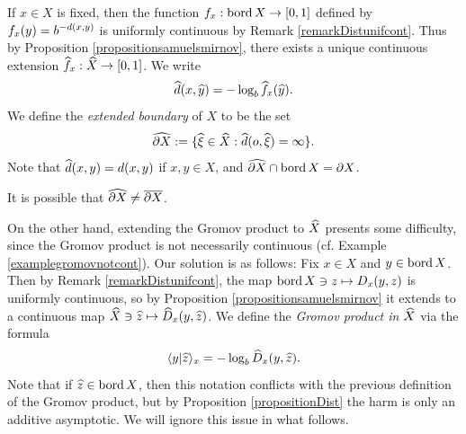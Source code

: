 \begin{observation}
If $x\in X$ is fixed, then the function $f_x:\operatorname{bord} X\to [0,1]$ defined by $f_x(y) = b^{-d(x,y)}$ is uniformly continuous by Remark \ref{remarkDistunifcont}. Thus by Proposition \ref{propositionsamuelsmirnov}, there exists a unique continuous extension $\fhat_x:\what X\to [0,1]$. We write 
\[
\dhat(x,\what y) = -\log_b\fhat_x(\what y).
\]
We define the \emph{extended boundary} of $X$ to be the set
\[
\what{\del X} := \{\xihat\in\what X:\dhat(\zero,\xihat) = \infty\}.
\]
Note that $\dhat(x,y) = \dist(x,y)$ if $x,y\in X$, and $\widehat{\partial X} \cap \operatorname{bord} X = \partial X$.
\end{observation}

\begin{warning*}
It is possible that $\widehat{\partial X}\neq\overline{\partial X}$.
\end{warning*}

On the other hand, extending the Gromov product to $\widehat X$ presents some difficulty, since the Gromov product is not necessarily continuous (cf. Example \ref{examplegromovnotcont}). Our solution is as follows: Fix $x\in X$ and $y\in\operatorname{bord} X$. Then by Remark \ref{remarkDistunifcont}, the map $\operatorname{bord} X\ni z\mapsto D_x(y,z)$ is uniformly continuous, so by Proposition \ref{propositionsamuelsmirnov} it extends to a continuous map $\widehat X\ni \widehat z\mapsto \widehat{D}_x(y,\widehat z)$. We define the \emph{Gromov product in $\widehat X$} via the formula
\[
\langle y|\widehat z\rangle_x = -\log_b \widehat{D}_x(y,\widehat z).
\]
Note that if $\widehat z\in \operatorname{bord} X$, then this notation conflicts with the previous definition of the Gromov product, but by Proposition \ref{propositionDist} the harm is only an additive asymptotic. We will ignore this issue in what follows.

